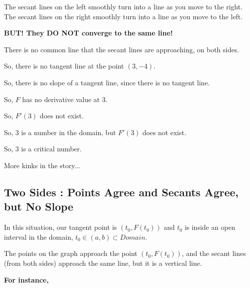 \documentclass{ximera}
\begin{document}
The secant lines on the left smoothly turn into a line as you move to the right. The secant lines on the right smoothly turn into a line as you move to the left. 


\begin{center}
\textbf{\textcolor{blue!55!black}{BUT!  They DO NOT converge to the same line!}}
\end{center}





There is no common line that the secant lines are approaching, on both sides. 

So, there is no tangent line at the point $(3,-4)$. 

So, there is no slope of a tangent line, since there is no tangent line. 

So, $F$ has no derivative value at $3$.  

So, $F'(3)$ does not exist. 

So, $3$ is a number in the domain, but $F'(3)$ does not exist. 

So, $3$ is a critical number.






























More kinks in the story...

\subsection*{Two Sides : Points Agree and Secants Agree, but No Slope}


In this situation, our tangent point is $(t_0 , F(t_0))$ and $t_0$ is inside an open interval in the domain, $t_0 \in (a, b) \subset Domain$. 


The points on the graph approach the point $(t_0 , F(t_0))$, and the secant lines (from both sides) approach the same line, but it is a vertical line. 



\textbf{For instance,} 
\end{document}
